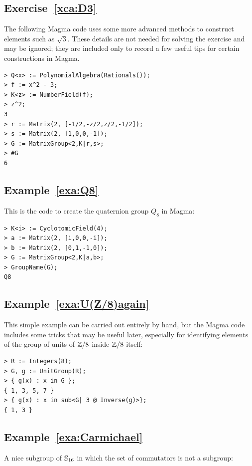 \subsection*{Exercise~\ref{xca:D3}}

The following Magma code uses some more advanced methods to construct elements such as $\sqrt{3}$. These details are not needed for solving the exercise and may be ignored; they are included only to record a few useful tips for certain constructions in Magma. 

\begin{lstlisting}
> Q<x> := PolynomialAlgebra(Rationals());
> f := x^2 - 3;
> K<z> := NumberField(f);
> z^2;
3
> r := Matrix(2, [-1/2,-z/2,z/2,-1/2]);
> s := Matrix(2, [1,0,0,-1]);
> G := MatrixGroup<2,K|r,s>;
> #G
6      
\end{lstlisting}

\subsection*{Example~\ref{exa:Q8}}

This is the code to create the quaternion group $Q_8$ 
in Magma:
\begin{lstlisting}
> K<i> := CyclotomicField(4);
> a := Matrix(2, [i,0,0,-i]);
> b := Matrix(2, [0,1,-1,0]);
> G := MatrixGroup<2,K|a,b>;
> GroupName(G);
Q8      
\end{lstlisting}    

\subsection*{Example~\ref{exa:U(Z/8)again}}

This simple example can be carried out entirely by hand, 
but the Magma code includes some tricks that may be useful 
later, especially for identifying elements of the group 
of units of $\mathbb{Z}/8$ inside $\mathbb{Z}/8$ itself:
\begin{lstlisting}
> R := Integers(8);
> G, g := UnitGroup(R);
> { g(x) : x in G };
{ 1, 3, 5, 7 }
> { g(x) : x in sub<G| 3 @ Inverse(g)>};
{ 1, 3 }    
\end{lstlisting}

\subsection*{Example~\ref{exa:Carmichael}}
\label{magma:Carmichael}

A nice subgroup of $\mathbb{S}_{16}$ 
in which the set of commutators is not a subgroup: 

